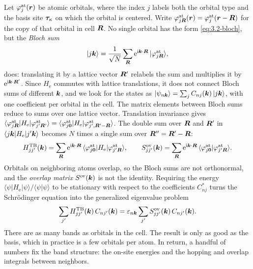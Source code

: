 Let $\varphi^{\mathrm{at}}_j(\bm{r})$ be atomic orbitals, where the index $j$ labels both the orbital type and the basis site $\bm{\tau}_\kappa$ on which the orbital is centered. Write $\varphi^{\mathrm{at}}_{j\bm{R}}(\bm{r}) = \varphi^{\mathrm{at}}_j(\bm{r} - \bm{R})$ for the copy of that orbital in cell $\bm{R}$. No single orbital has the form \cref{eq:3.2-bloch}, but the \emph{Bloch sum}
\begin{equation}
  |j\bm{k}\rangle = \frac{1}{\sqrt N}\sum_{\bm{R}}\mathrm{e}^{\mathrm{i}\bm{k}\cdot\bm{R}}\,|\varphi^{\mathrm{at}}_{j\bm{R}}\rangle ,
  \label{eq:3.2-blochsum}
\end{equation}
does: translating it by a lattice vector $\bm{R}'$ relabels the sum and multiplies it by $\mathrm{e}^{\mathrm{i}\bm{k}\cdot\bm{R}'}$. Since $H_{\mathrm{e}}$ commutes with lattice translations, it does not connect Bloch sums of different $\bm{k}$, and we look for the states as $|\psi_{n\bm{k}}\rangle = \sum_jC_{nj}(\bm{k})\,|j\bm{k}\rangle$, with one coefficient per orbital in the cell. The matrix elements between Bloch sums reduce to sums over one lattice vector. Translation invariance gives $\langle\varphi^{\mathrm{at}}_{j\bm{R}}|H_{\mathrm{e}}|\varphi^{\mathrm{at}}_{j'\bm{R}'}\rangle = \langle\varphi^{\mathrm{at}}_{j\bm{0}}|H_{\mathrm{e}}|\varphi^{\mathrm{at}}_{j',\bm{R}'-\bm{R}}\rangle$. The double sum over $\bm{R}$ and $\bm{R}'$ in $\langle j\bm{k}|H_{\mathrm{e}}|j'\bm{k}\rangle$ becomes $N$ times a single sum over $\bm{R}'' = \bm{R}' - \bm{R}$:
\begin{equation}
  H^{\mathrm{TB}}_{jj'}(\bm{k}) = \sum_{\bm{R}}\mathrm{e}^{\mathrm{i}\bm{k}\cdot\bm{R}}\,\langle\varphi^{\mathrm{at}}_{j\bm{0}}|H_{\mathrm{e}}|\varphi^{\mathrm{at}}_{j'\bm{R}}\rangle, \qquad
  S^{\mathrm{ov}}_{jj'}(\bm{k}) = \sum_{\bm{R}}\mathrm{e}^{\mathrm{i}\bm{k}\cdot\bm{R}}\,\langle\varphi^{\mathrm{at}}_{j\bm{0}}|\varphi^{\mathrm{at}}_{j'\bm{R}}\rangle .
  \label{eq:3.2-HS}
\end{equation}
Orbitals on neighboring atoms overlap, so the Bloch sums are not orthonormal, and the \emph{overlap matrix} $S^{\mathrm{ov}}(\bm{k})$ is not the identity. Requiring the energy $\langle\psi|H_{\mathrm{e}}|\psi\rangle/\langle\psi|\psi\rangle$ to be stationary with respect to the coefficients $C^*_{nj}$ turns the Schr\"odinger equation into the generalized eigenvalue problem
\begin{equation}
  \sum_{j'}H^{\mathrm{TB}}_{jj'}(\bm{k})\,C_{nj'}(\bm{k}) = \varepsilon_{n\bm{k}}\sum_{j'}S^{\mathrm{ov}}_{jj'}(\bm{k})\,C_{nj'}(\bm{k}) .
  \label{eq:3.2-LCAO}
\end{equation}
There are as many bands as orbitals in the cell. The result is only as good as the basis, which in practice is a few orbitals per atom. In return, a handful of numbers fix the band structure: the on-site energies and the hopping and overlap integrals between neighbors.

